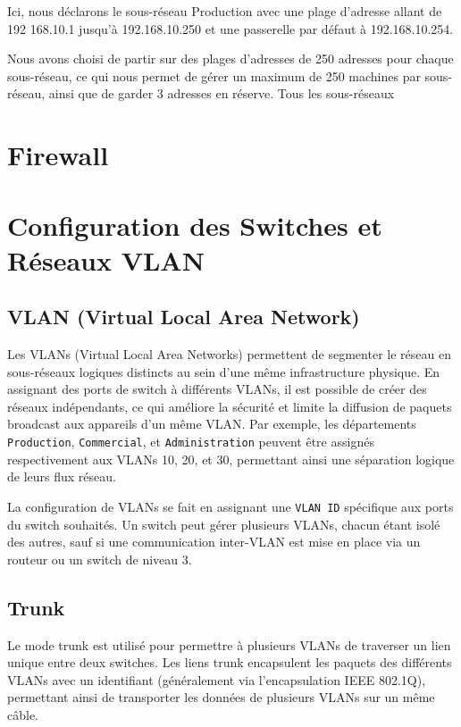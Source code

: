 \documentclass[a4paper,12pt]{report}
\begin{document}
                Ici, nous déclarons le sous-réseau Production avec une plage d'adresse allant de 192
                168.10.1 jusqu'à 192.168.10.250 et une passerelle par défaut à 192.168.10.254.

                Nous avons choisi de partir sur des plages d'adresses de 250 adresses pour chaque sous-réseau, ce qui nous permet de gérer un maximum de 250 machines par sous-réseau, ainsi que de garder 3 adresses en réserve.
                Tous les sous-réseaux 



        \section{Firewall}
        \section{Configuration des Switches et Réseaux VLAN}

            \subsection{VLAN (Virtual Local Area Network)}
                Les VLANs (Virtual Local Area Networks) permettent de segmenter le réseau en sous-réseaux logiques distincts au sein d'une même infrastructure physique. En assignant des ports de switch à différents VLANs, il est possible de créer des réseaux indépendants, ce qui améliore la sécurité et limite la diffusion de paquets broadcast aux appareils d'un même VLAN. Par exemple, les départements \texttt{Production}, \texttt{Commercial}, et \texttt{Administration} peuvent être assignés respectivement aux VLANs 10, 20, et 30, permettant ainsi une séparation logique de leurs flux réseau.

                La configuration de VLANs se fait en assignant une \texttt{VLAN ID} spécifique aux ports du switch souhaités. Un switch peut gérer plusieurs VLANs, chacun étant isolé des autres, sauf si une communication inter-VLAN est mise en place via un routeur ou un switch de niveau 3.

            \subsection{Trunk}
                Le mode trunk est utilisé pour permettre à plusieurs VLANs de traverser un lien unique entre deux switches. Les liens trunk encapsulent les paquets des différents VLANs avec un identifiant (généralement via l'encapsulation IEEE 802.1Q), permettant ainsi de transporter les données de plusieurs VLANs sur un même câble.
\end{document}
